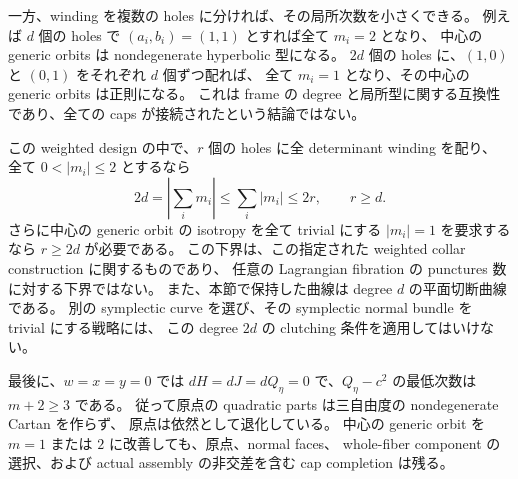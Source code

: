 一方、winding を複数の holes に分ければ、その局所次数を小さくできる。
例えば $d$ 個の holes で $(a_i,b_i)=(1,1)$ とすれば全て $m_i=2$ となり、
中心の generic orbits は nondegenerate hyperbolic 型になる。
$2d$ 個の holes に、$(1,0)$ と $(0,1)$ をそれぞれ $d$ 個ずつ配れば、
全て $m_i=1$ となり、その中心の generic orbits は正則になる。
これは frame の degree と局所型に関する互換性であり、全ての caps が接続されたという結論ではない。

この weighted design の中で、$r$ 個の holes に全 determinant winding を配り、
全て $0<|m_i|\le2$ とするなら
\[
 2d=\left|\sum_i m_i\right|\le\sum_i|m_i|\le2r,
 \qquad r\ge d.
\]
さらに中心の generic orbit の isotropy を全て trivial にする $|m_i|=1$ を要求するなら
$r\ge2d$ が必要である。
この下界は、この指定された weighted collar construction に関するものであり、
任意の Lagrangian fibration の punctures 数に対する下界ではない。
また、本節で保持した曲線は degree $d$ の平面切断曲線である。
別の symplectic curve を選び、その symplectic normal bundle を trivial にする戦略には、
この degree $2d$ の clutching 条件を適用してはいけない。

最後に、$w=x=y=0$ では $dH=dJ=dQ_\eta=0$ で、$Q_\eta-c^2$ の最低次数は $m+2\ge3$ である。
従って原点の quadratic parts は三自由度の nondegenerate Cartan を作らず、
原点は依然として退化している。
中心の generic orbit を $m=1$ または $2$ に改善しても、原点、normal faces、
whole-fiber component の選択、および actual assembly の非交差を含む cap completion は残る。
